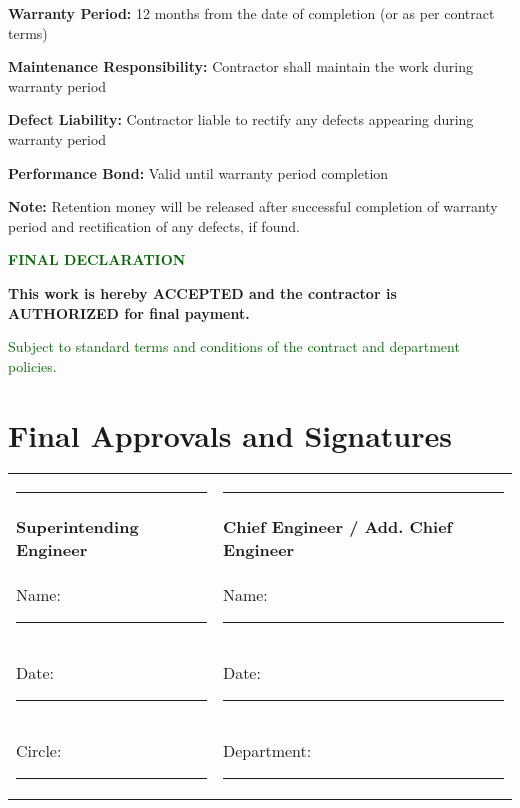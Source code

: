 \documentclass[12pt,a4paper]{article}
\begin{document}
\begin{center}
{\begin{minipage}{0.95\textwidth}
\begin{center}
{\begin{minipage}{0.9\textwidth}
\vspace{0.3cm}
\textbf{Warranty Period:} 12 months from the date of completion (or as per contract terms)

\textbf{Maintenance Responsibility:} Contractor shall maintain the work during warranty period

\textbf{Defect Liability:} Contractor liable to rectify any defects appearing during warranty period

\textbf{Performance Bond:} Valid until warranty period completion

\vspace{0.3cm}
\small\textbf{Note:} Retention money will be released after successful completion of warranty period and rectification of any defects, if found.
\end{minipage}}
\end{center}

\vspace{1cm}
\begin{center}
\colorbox{finalgreen!30}{\begin{minipage}{0.8\textwidth}
\begin{center}
\textbf{\Large\textcolor{darkgreen}{FINAL DECLARATION}}

\vspace{0.5cm}
\textbf{\large This work is hereby ACCEPTED and the contractor is AUTHORIZED for final payment.}

\vspace{0.3cm}
\textcolor{darkgreen}{Subject to standard terms and conditions of the contract and department policies.}
\end{center}
\end{minipage}}
\end{center}

\vspace{1cm}
\end{minipage}}
\end{center}

\vspace{1.5cm}
\section*{Final Approvals and Signatures}

\begin{center}
\begin{tabular}{p{7cm}p{7cm}}
\rule{6cm}{0.5pt} & \rule{6cm}{0.5pt} \\
\textbf{Superintending Engineer} & \textbf{Chief Engineer / Add. Chief Engineer} \\
Name: \rule{5cm}{0.5pt} & Name: \rule{5cm}{0.5pt} \\
Date: \rule{5cm}{0.5pt} & Date: \rule{5cm}{0.5pt} \\
Circle: \rule{5cm}{0.5pt} & Department: \rule{4cm}{0.5pt} \\
\end{tabular}
\end{center}
\end{document}
